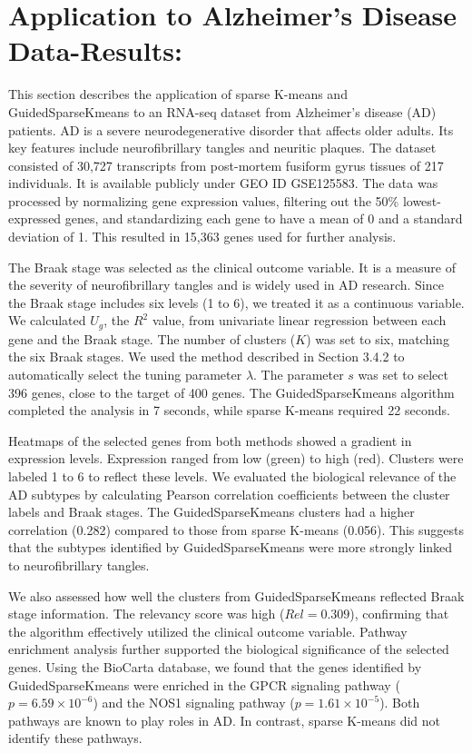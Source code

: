\documentclass{statsoc}
\begin{document}
\section{Application to Alzheimer’s Disease Data-Results:}

This section describes the application of sparse K-means and GuidedSparseKmeans to an RNA-seq dataset from Alzheimer’s disease (AD) patients. AD is a severe neurodegenerative disorder that affects older adults. Its key features include neurofibrillary tangles and neuritic plaques. The dataset consisted of 30,727 transcripts from post-mortem fusiform gyrus tissues of 217 individuals. It is available publicly under GEO ID GSE125583. The data was processed by normalizing gene expression values, filtering out the 50\% lowest-expressed genes, and standardizing each gene to have a mean of 0 and a standard deviation of 1. This resulted in 15,363 genes used for further analysis.

The Braak stage was selected as the clinical outcome variable. It is a measure of the severity of neurofibrillary tangles and is widely used in AD research. Since the Braak stage includes six levels (1 to 6), we treated it as a continuous variable. We calculated $U_g$, the $R^2$ value, from univariate linear regression between each gene and the Braak stage. The number of clusters ($K$) was set to six, matching the six Braak stages. We used the method described in Section 3.4.2 to automatically select the tuning parameter $\lambda$. The parameter $s$ was set to select 396 genes, close to the target of 400 genes. The GuidedSparseKmeans algorithm completed the analysis in 7 seconds, while sparse K-means required 22 seconds.

Heatmaps of the selected genes from both methods showed a gradient in expression levels. Expression ranged from low (green) to high (red). Clusters were labeled 1 to 6 to reflect these levels. We evaluated the biological relevance of the AD subtypes by calculating Pearson correlation coefficients between the cluster labels and Braak stages. The GuidedSparseKmeans clusters had a higher correlation (0.282) compared to those from sparse K-means (0.056). This suggests that the subtypes identified by GuidedSparseKmeans were more strongly linked to neurofibrillary tangles.

We also assessed how well the clusters from GuidedSparseKmeans reflected Braak stage information. The relevancy score was high ($Rel = 0.309$), confirming that the algorithm effectively utilized the clinical outcome variable. Pathway enrichment analysis further supported the biological significance of the selected genes. Using the BioCarta database, we found that the genes identified by GuidedSparseKmeans were enriched in the GPCR signaling pathway ($p = 6.59 \times 10^{-6}$) and the NOS1 signaling pathway ($p = 1.61 \times 10^{-5}$). Both pathways are known to play roles in AD. In contrast, sparse K-means did not identify these pathways.
\end{document}

